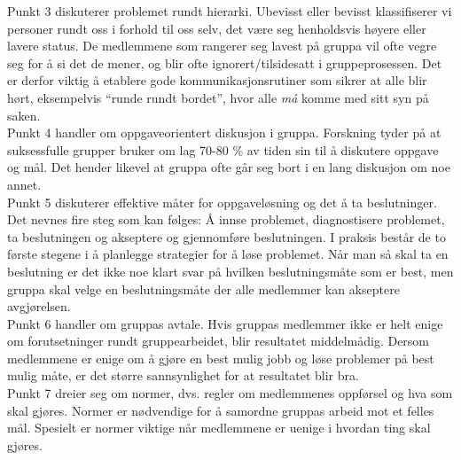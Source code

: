 Punkt 3 diskuterer problemet rundt hierarki. Ubevisst eller bevisst
klassifiserer vi personer rundt oss i forhold til oss selv, det være seg
henholdsvis høyere eller lavere status. De medlemmene som rangerer seg lavest på
gruppa vil ofte vegre seg for å si det de mener, og blir ofte
ignorert/tilsidesatt i gruppeprosessen. Det er derfor viktig å etablere gode
kommunikasjonsrutiner som sikrer at alle blir hørt, eksempelvis ``runde rundt
bordet'', hvor alle \emph{må} komme med sitt syn på saken. \\


Punkt 4 handler om oppgaveorientert diskusjon i gruppa. Forskning tyder på at
suksessfulle grupper bruker om lag 70-80 \% av tiden sin til å diskutere oppgave
og mål. Det hender likevel at gruppa ofte går seg bort i en lang diskusjon om noe
annet. \\

Punkt 5 diskuterer effektive måter for oppgaveløsning og det å ta beslutninger.
Det nevnes fire steg som kan følges: Å innse problemet, diagnostisere problemet,
ta beslutningen og akseptere og gjennomføre beslutningen. I praksis består de
to første stegene i å planlegge strategier for å løse problemet. Når man så skal
ta en beslutning er det ikke noe klart svar på hvilken beslutningsmåte som er
best, men gruppa skal velge en beslutningsmåte der alle medlemmer kan akseptere
avgjørelsen.  \\

Punkt 6 handler om gruppas avtale. Hvis gruppas medlemmer ikke er helt enige om
forutsetninger rundt gruppearbeidet, blir resultatet middelmådig. Dersom
medlemmene er enige om å gjøre en best mulig jobb og løse problemer på
best mulig måte, er det større sannsynlighet for at resultatet blir bra. \\

Punkt 7 dreier seg om normer, dvs. regler om medlemmenes oppførsel og hva som skal gjøres. Normer er nødvendige for å samordne gruppas arbeid mot et felles mål. Spesielt er normer viktige når medlemmene er uenige i hvordan ting skal gjøres. \\

